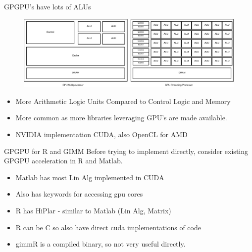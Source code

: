 \documentclass{beamer}
\begin{document}
\begin{frame}{GPGPU's have lots of ALUs}
\begin{figure}
  \centering \includegraphics[scale=.20]{doc/GPUvCPUArch}
\end{figure}
\begin{itemize}
 \item More Arithmetic Logic Units Compared to Control Logic and Memory
 \item More common as more libraries leveraging GPU's are made available.
 \item NVIDIA implementation CUDA, also OpenCL for AMD
\end{itemize}
\end{frame}

\begin{frame}{GPGPU for R and GIMM}
  Before trying to implement directly, consider existing GPGPU 
  acceleration in R and Matlab.
  \begin{itemize}
   \item Matlab has most Lin Alg implemented in CUDA
   \item Also has keywords for accessing gpu cores
   \item R has HiPlar - similar to Matlab (Lin Alg, Matrix)
   \item R can be C so also have direct cuda implementations of code
   \item gimmR is a compiled binary, so not very useful directly.
  \end{itemize}
\end{frame}
\end{document}
